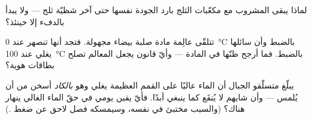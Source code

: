 \begin{exercise}[$\star$]\label{exo:g4:changes-of-state:9}
لماذا يبقى المشروب مع مكعّبات الثلج بارد الجودة نفسها حتى آخر
شظيّة ثلج --- ولا يبدأ بالدفء إلا حينئذ؟
\end{exercise}

\begin{exercise}[$\star\star$]\label{exo:g4:changes-of-state:10}
تتلقّى عالِمة مادة صلبة بيضاء مجهولة. فتجد أنها تنصهر عند
\qty{0}{\celsius} بالضبط وأن سائلها يغلي عند \qty{100}{\celsius}
بالضبط. فما أرجح ظنّها في المادة --- وأيّ قانون يجعل المعالم
تصلح بطاقات هوية؟
\end{exercise}

\begin{exercise}[$\star\star$]\label{exo:g4:changes-of-state:11}
يبلّغ متسلّقو الجبال أن الماء عاليًا على القمم العظيمة يغلي وهو
\emph{بالكاد} أسخن من أن يُلمس --- وأن شايهم لا يُنقَع كما ينبغي
أبدًا. فأيّ يقين يومي في حقّ الماء الغالي ينهار هناك؟ (والسبب
مختبئ في  نفسه، وسيمسكه فصل لاحق عن ضغط .)
\end{exercise}
